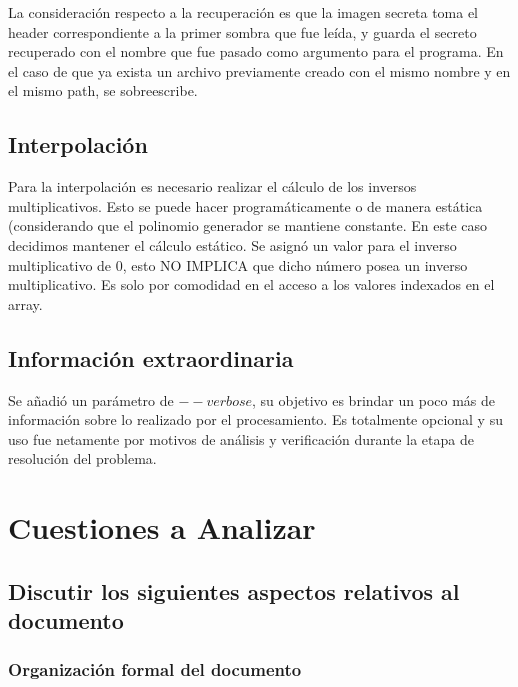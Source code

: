 \documentclass[11pt]{scrartcl} %
\begin{document}
La consideración respecto a la recuperación es que la imagen secreta toma el header correspondiente a la primer sombra que fue leída, y guarda el secreto recuperado con el nombre que fue pasado como argumento para el programa. En el caso de que ya exista un archivo previamente creado con el mismo nombre y en el mismo path, se sobreescribe.

\subsection{Interpolación}

Para la interpolación es necesario realizar el cálculo de los inversos multiplicativos. Esto se puede hacer programáticamente o de manera estática (considerando que el polinomio generador se mantiene constante. En este caso decidimos mantener el cálculo estático. Se asignó un valor para el inverso multiplicativo de 0, esto NO IMPLICA que dicho número posea un inverso multiplicativo. Es solo por comodidad en el acceso a los valores indexados en el array.

\subsection{Información extraordinaria}

Se añadió un parámetro de $--verbose$, su objetivo es brindar un poco más de información sobre lo realizado por el procesamiento. Es totalmente opcional y su uso fue netamente por motivos de análisis y verificación durante la etapa de resolución del problema.




\section{Cuestiones a Analizar}

\subsection{Discutir los siguientes aspectos relativos al documento}

\subsubsection{Organización formal del documento}
\end{document}
